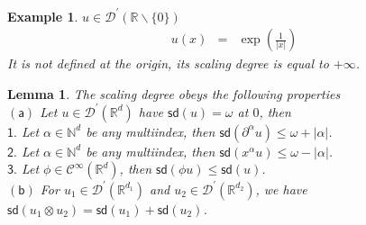 \documentclass[10pt]{book}
\newcommand{\sd}{\mathsf{sd}}
\newcommand{\abs}[1]{\left|#1\right|}
\newcommand{\Ccal}{\mathcal{C}}
\newcommand{\Dcal}{\mathcal{D}}
\newcommand{\Nbb}{\mathbb{N}}
\newcommand{\Rbb}{\mathbb{R}}
\theoremstyle{break}
\newtheorem{lemma}{Lemma}
\newtheorem{example}{Example}
\begin{document}
\begin{example} 
 $u \in \Dcal^\prime(\Rbb \backslash \{0\})$
 \begin{eqnarray*}
  u(x) &=& \exp\left(\frac{1}{\abs{x}}\right)
 \end{eqnarray*}
 It is not defined at the origin, its scaling degree is equal to $+\infty$. 
\end{example}

\begin{lemma}
 The scaling degree obeys the following properties \\
 $\mathsf{(a)}$ Let $u \in \Dcal^\prime(\Rbb^d)$ have $\sd(u) = \omega$ at $0$, then \\
 \hspace*{8mm} $\mathsf{1.}$ Let $\alpha \in \Nbb^d$ be any multiindex, then $\sd(\partial^\alpha u) \leq \omega + \abs{\alpha}$. \\
 \hspace*{8mm} $\mathsf{2.}$ Let $\alpha \in \Nbb^d$ be any multiindex, then $\sd(x^\alpha u) \leq \omega - \abs{\alpha}$. \\
 \hspace*{8mm} $\mathsf{3.}$ Let $\phi \in \Ccal^\infty(\Rbb^d)$, then $\sd(\phi u) \leq \sd(u)$. \\
 $\mathsf{(b)}$ For $u_1 \in \Dcal^\prime(\Rbb^{d_1})$ and $u_2 \in \Dcal^\prime(\Rbb^{d_2})$, we have $\sd(u_1\otimes u_2) = \sd(u_1) + \sd(u_2)$.
 
\end{lemma}
\end{document}
